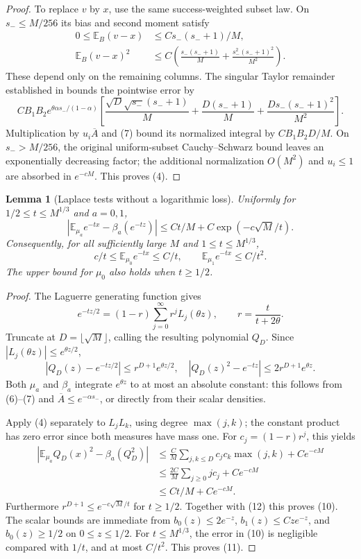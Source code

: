 \documentclass[11pt]{article}
\newtheorem{lemma}{Lemma}
\newcommand{\E}{\mathbb E}
\begin{document}
\begin{proof}
To replace $v$ by $x$, use the same success-weighted subset law.
On $s_-\le M/256$ its bias and second moment satisfy
\begin{align*}
 0\le\E_B(v-x)&\le C s_-(s_-+1)/M,\\
 \E_B(v-x)^2&\le C\left(\frac{s_-(s_-+1)}M
                    +\frac{s_-^2(s_-+1)^2}{M^2}\right).
\end{align*}
These depend only on the remaining columns. The singular Taylor
remainder established in
 bounds the pointwise
error by
\[
 C B_1B_2 e^{\theta\alpha s_-/(1-\alpha)}
 \left[\frac{\sqrt D\sqrt{s_-}(s_-+1)}M
       +\frac{D(s_-+1)}M+\frac{D s_-(s_-+1)^2}{M^2}\right].
\]
Multiplication by $u_i\overline A$ and (7) bound its normalized
integral by $CB_1B_2D/M$. On $s_->M/256$, the original uniform-subset
Cauchy--Schwarz bound leaves an exponentially decreasing factor;
the additional normalization $O(M^2)$ and $u_i\le1$ are absorbed
in $e^{-cM}$. This proves (4).
\end{proof}

\begin{lemma}[Laplace tests without a logarithmic loss]\label{laplace}
Uniformly for $1/2\le t\le M^{1/3}$ and $a=0,1$,
\[
 \left|\E_{\mu_a}e^{-t x}-\beta_a(e^{-t z})\right|
 \le C t/M+C\exp(-c\sqrt M/t).                   \tag{10}
\]
Consequently, for all sufficiently large $M$ and $1\le t\le M^{1/3}$,
\[
 c/t\le\E_{\mu_0}e^{-t x}\le C/t,\qquad
 \E_{\mu_1}e^{-t x}\le C/t^2.                    \tag{11}
\]
The upper bound for $\mu_0$ also holds when $t\ge1/2$.
\end{lemma}
\begin{proof}
The Laguerre generating function gives
\[
 e^{-tz/2}=(1-r)\sum_{j=0}^{\infty}r^jL_j(\theta z),
 \qquad r=\frac{t}{t+2\theta}.
\]
Truncate at $D=\lfloor\sqrt M\rfloor$, calling the resulting
polynomial $Q_D$. Since $|L_j(\theta z)|\le e^{\theta z/2}$,
\[
 |Q_D(z)-e^{-tz/2}|\le r^{D+1}e^{\theta z/2},\quad
 |Q_D(z)^2-e^{-tz}|\le2r^{D+1}e^{\theta z}.        \tag{12}
\]
Both $\mu_a$ and $\beta_a$ integrate $e^{\theta z}$ to at most an
absolute constant: this follows from (6)--(7) and
$\overline A\le e^{-\alpha s_-}$, or directly from their scalar
densities.

Apply (4) separately to $L_jL_k$, using degree $\max(j,k)$; the
constant product has zero error since both measures have mass one.
For $c_j=(1-r)r^j$, this yields
\begin{align*}
 |\E_{\mu_a}Q_D(x)^2-\beta_a(Q_D^2)|
 &\le\frac C M\sum_{j,k\le D}c_jc_k\max(j,k)+Ce^{-cM}\\
 &\le\frac{2C}M\sum_{j\ge0}j c_j+Ce^{-cM}\\
 &\le Ct/M+Ce^{-cM}.
\end{align*}
Furthermore $r^{D+1}\le e^{-c\sqrt M/t}$ for $t\ge1/2$.
Together with (12) this proves (10).
The scalar bounds are immediate from $b_0(z)\le2e^{-z}$,
$b_1(z)\le Cze^{-z}$, and $b_0(z)\ge1/2$ on $0\le z\le1/2$.
For $t\le M^{1/3}$, the error in (10) is negligible compared with
$1/t$, and at most $C/t^2$. This proves (11).
\end{proof}
\end{document}
